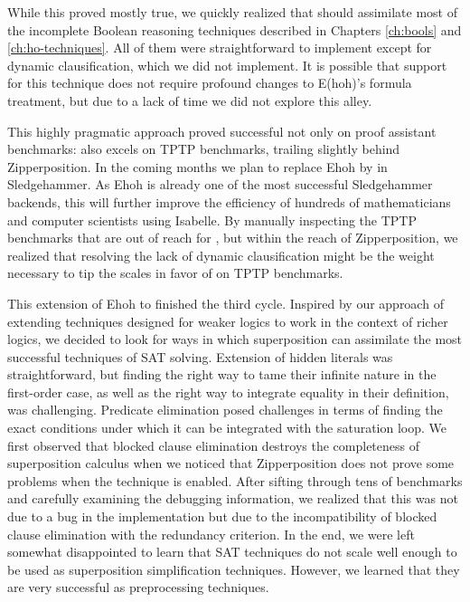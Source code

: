 While this proved mostly true, we quickly realized that \ehohii{} should
assimilate most of the incomplete Boolean reasoning techniques described in Chapters
\ref{ch:bools} and \ref{ch:ho-techniques}. All of them were straightforward to
implement except for dynamic clausification, which we did not implement. It is
possible that support for this technique does not require profound changes to
E(hoh)'s formula treatment, but due to a lack of time we did not explore this
alley.

This highly pragmatic approach proved successful not only on proof assistant
benchmarks: \ehohii{} also excels on TPTP benchmarks, trailing slightly behind
Zipperposition. In the coming months we plan to replace Ehoh by \ehohii{} in Sledgehammer.
As Ehoh is already one of the most successful Sledgehammer backends,
this will further improve the efficiency of hundreds of mathematicians and computer scientists using Isabelle.
By manually inspecting the TPTP benchmarks that are out of reach
for \ehohii{}, but within the reach of Zipperposition, we realized that resolving the lack of
dynamic clausification might be the weight necessary to tip the scales in
favor of \ehohii{} on TPTP benchmarks. 

This extension of Ehoh to \ehohii{} finished the third cycle. Inspired by our
approach of extending techniques designed for weaker logics to work in the
context of richer logics, we decided to look for ways in which superposition can
assimilate the most successful techniques of SAT solving. Extension of hidden
literals was straightforward, but finding the right way to tame their infinite
nature in the first-order case, as well as the right way to integrate equality
in their definition, was challenging. Predicate elimination posed challenges in
terms of finding the exact conditions under which it can be integrated with the
saturation loop. We first observed that blocked clause elimination destroys the
completeness of superposition calculus when we noticed that Zipperposition does
not prove some problems when the technique is enabled. After sifting through tens of
benchmarks and carefully examining the debugging information, we realized that
this was not due to a bug in the implementation but due to the incompatibility of
blocked clause elimination with the redundancy criterion. In the end, we were left
somewhat disappointed to learn that SAT techniques do not scale well enough to be used
as superposition simplification techniques. However, we learned that they are
very successful as preprocessing techniques.

